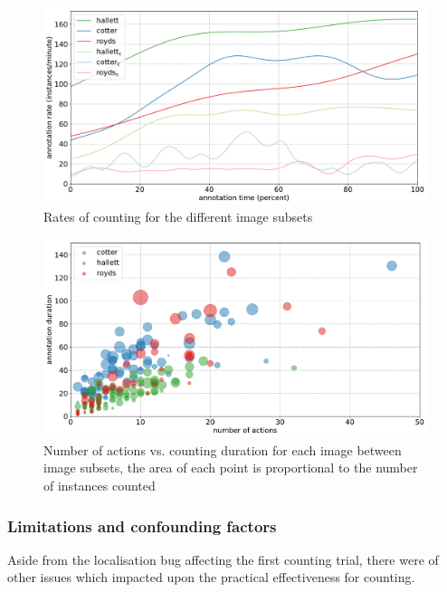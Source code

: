 \begin{figure}[ht]
\centering
\includegraphics[width=1.0\linewidth]{charts/aerial_penguins/summaries/instance_rates.pdf}
\caption{ Rates of counting for the different image subsets }
\label{fig:penguin_rates}
\end{figure}



\begin{figure}[ht]
\centering
\includegraphics[width=1.0\linewidth]{charts/aerial_penguins/actions_time_a.pdf}
\caption{ Number of actions vs. counting duration for each image between image subsets, the area of each point is proportional to the number of instances counted }
\label{fig:actions_time_penguins}
\end{figure}


\subsubsection{Limitations and confounding factors}

Aside from the localisation bug affecting the first counting trial, there were of other issues which impacted upon the practical effectiveness for counting.

